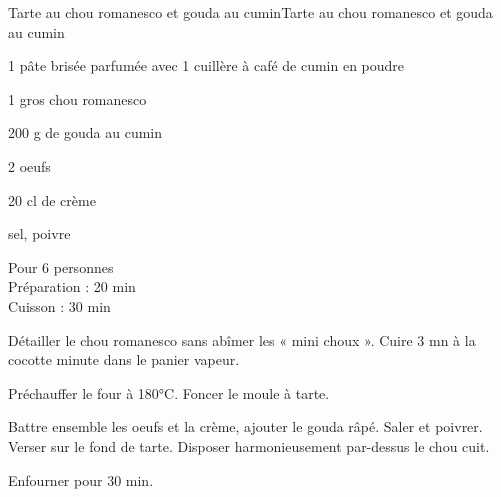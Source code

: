\begin{recette}{Tarte au chou romanesco et gouda au cumin}{Tarte au chou romanesco et gouda au cumin}

\begin{ingredients}
1 pâte brisée parfumée avec 1 cuillère à café de cumin en poudre\par
1 gros chou romanesco\par
200 g de gouda au cumin\par
2 oeufs\par
20 cl de crème\par
sel, poivre\par
\end{ingredients}

\begin{infos}
Pour 6 personnes	\\
Préparation : 20 min\\
Cuisson : 30 min\\
\end{infos}

\begin{etapes}
\item Détailler le chou romanesco sans abîmer les « mini choux ». Cuire 3 mn à la cocotte minute dans le panier vapeur.
\item Préchauffer le four à 180°C. Foncer le moule à tarte.
\item Battre ensemble les oeufs et la crème, ajouter le gouda râpé. Saler et poivrer. Verser sur le fond de tarte. Disposer harmonieusement par-dessus le chou cuit.
\item Enfourner pour 30 min.
\end{etapes}

\end{recette}
